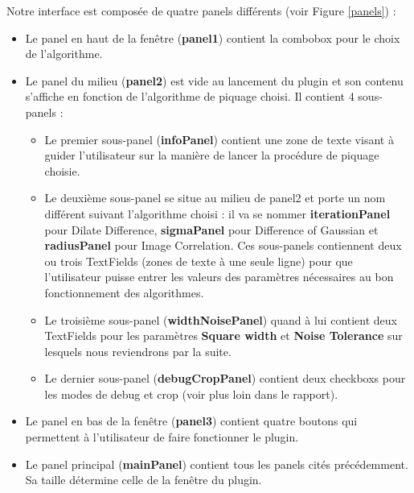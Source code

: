 Notre interface est composée de quatre panels différents (voir Figure \ref{panels}) :
\begin{itemize}

\item Le panel en haut de la fenêtre (\textbf{panel1}) contient la combobox pour le choix de l'algorithme. 
\item Le panel du milieu (\textbf{panel2}) est vide au lancement du plugin et son contenu s'affiche en fonction de l'algorithme de piquage choisi. Il contient 4 sous-panels :
\begin{itemize}
\item Le premier sous-panel (\textbf{infoPanel}) contient une zone de texte visant à guider l'utilisateur sur la manière de lancer la procédure de piquage choisie. 
\item Le deuxième sous-panel se situe au milieu de panel2 et porte un nom différent suivant l'algorithme choisi : il va se nommer \textbf{iterationPanel} pour Dilate Difference, \textbf{sigmaPanel} pour Difference of Gaussian et \textbf{radiusPanel} pour Image Correlation. Ces sous-panels contiennent deux ou trois TextFields (zones de texte à une seule ligne) pour que l'utilisateur puisse entrer les valeurs des paramètres nécessaires au bon fonctionnement des algorithmes. 
\item Le troisième sous-panel (\textbf{widthNoisePanel}) quand à lui contient deux TextFields pour les paramètres \textbf{Square width} et \textbf{Noise Tolerance} sur lesquels nous reviendrons par la suite. 
\item Le dernier sous-panel (\textbf{debugCropPanel}) contient deux checkboxs pour les modes de debug et crop (voir plus loin dans le rapport). 
\end{itemize}
\item Le panel en bas de la fenêtre (\textbf{panel3}) contient quatre boutons qui permettent à l'utilisateur de faire fonctionner le plugin. 
\item Le panel principal (\textbf{mainPanel}) contient tous les panels cités précédemment. Sa taille détermine celle de la fenêtre du plugin. 
\end{itemize}


